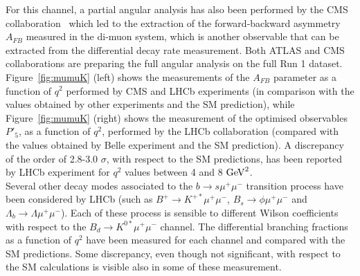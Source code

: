 For this channel, a partial angular analysis has also been performed by the CMS collaboration~\cite{mumuK_CMS} which led to the extraction of the forward-backward asymmetry $A_{FB}$  measured in the di-muon system, which is another observable that can be extracted from the differential decay rate measurement. Both ATLAS and CMS collaborations are preparing the full angular analysis on the full Run 1 dataset.  Figure~\ref{fig:mumuK} (left) shows the measurements of the $A_{FB}$ parameter as a function of $q^2$ performed by CMS and LHCb experiments (in comparison with the values obtained by other experiments and the SM prediction), while Figure~\ref{fig:mumuK} (right) shows the measurement of the optimised observables $P'_5$, as a function of $q^2$,  performed by the LHCb collaboration (compared with the values obtained by Belle experiment and the SM prediction). A discrepancy of the order of 2.8-3.0 $\sigma$, with respect to the SM predictions, has been reported by LHCb experiment for $q^2$ values between 4 and 8 ${\rm{GeV}}^2$.\\
Several other decay modes associated to the $b \to s \mu^+ \mu^-$ transition process have been considered by LHCb (such as $B^+ \to K^{+*} \mu^+ \mu^-$, $B_s \to  \phi \mu^+ \mu^-$ and $\Lambda_b \to \Lambda \mu^+ \mu^-$). Each of these process is sensible to different Wilson coefficients with respect to the $B_d \to  K^{0*} \mu^+ \mu^-$ channel. The differential branching fractions as a function of $q^2$ have been measured for each channel and compared with the SM predictions. Some discrepancy, even though not significant, with respect to the SM calculations is visible also in some of these measurement.\\
